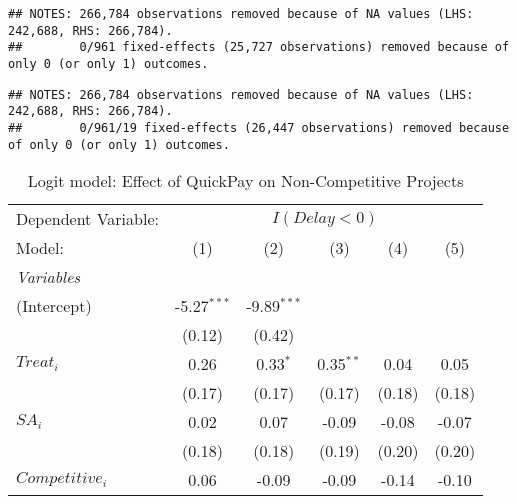 \documentclass[
]{article}
\begin{document}
\begin{verbatim}
## NOTES: 266,784 observations removed because of NA values (LHS: 242,688, RHS: 266,784).
##        0/961 fixed-effects (25,727 observations) removed because of only 0 (or only 1) outcomes.
\end{verbatim}

\begin{verbatim}
## NOTES: 266,784 observations removed because of NA values (LHS: 242,688, RHS: 266,784).
##        0/961/19 fixed-effects (26,447 observations) removed because of only 0 (or only 1) outcomes.
\end{verbatim}

\begin{table}[htbp]
   \centering
   \caption{Logit model: Effect of QuickPay on Non-Competitive Projects}
   \begin{tabular}{lccccc}
      \tabularnewline\midrule\midrule
      Dependent Variable: & \multicolumn{5}{c}{$I(Delay<0)$}\\
      Model:                                                                  & (1)           & (2)           & (3)          & (4)         & (5)\\
      \midrule \emph{Variables} &   &   &   &   &  \\
      (Intercept)                                                             & -5.27$^{***}$ & -9.89$^{***}$ &              &             &   \\
                                                                              & (0.12)        & (0.42)        &              &             &   \\
      $Treat_i$                                                               & 0.26          & 0.33$^{*}$    & 0.35$^{**}$  & 0.04        & 0.05\\
                                                                              & (0.17)        & (0.17)        & (0.17)       & (0.18)      & (0.18)\\
      $SA_i$                                                                  & 0.02          & 0.07          & -0.09        & -0.08       & -0.07\\
                                                                              & (0.18)        & (0.18)        & (0.19)       & (0.20)      & (0.20)\\
      $Competitive_i$                                                         & 0.06          & -0.09         & -0.09        & -0.14       & -0.10\\

\end{tabular}
\end{table}
\end{document}
